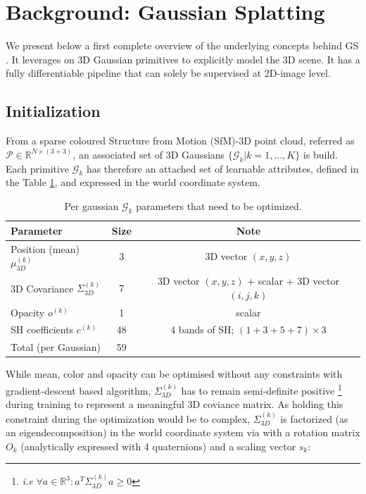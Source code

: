 \section{Background: Gaussian Splatting}
We present below a first complete overview of the underlying concepts behind \ac{GS} \citep{kerbl20233d}. It leverages on 3D Gaussian primitives to explicitly model the 3D scene. It has a fully differentiable pipeline that can solely be supervised at 2D-image level. 


\subsection{Initialization} From a sparse coloured Structure from Motion (SfM)-3D point cloud, referred as $\mathcal{P}\in\mathbb{R}^{N\times(3+3)}$, an associated set of 3D Gaussians $\{\mathcal{G}_{k}|k=1,...,K\}$ is build. Each primitive $\mathcal{G}_{k} $ has therefore an attached set of learnable attributes, defined in the Table \ref{tab:gauss-param}, and expressed in the world coordinate system.

\begin{table}[h!]
  \centering
   \caption{Per gaussian $\mathcal{G}_{k} $  parameters that need to be optimized.}
  \begin{tabular}{lcc}
  \hline
  Parameter  & Size & Note \\
  \hline
  Position (mean)  $\mu^{(k)}_{3D}$ & 3 & 3D vector $(x, y, z)$ \\
  3D Covariance $\Sigma^{(k)}_{3D}$ & 7 & 3D vector $(x, y, z)$ + scalar + 3D vector  $(i, j, k)$\\
  Opacity  $o^{(k)}$ & 1 & scalar \\
  SH coefficients  $c^{(k)}$ & 48 & 4 bands of SH; $(1+3+5+7)\times3$ \\
  \hline
  Total (per Gaussian)  & 59 & \\
  \hline
  \end{tabular}
 
  \label{tab:gauss-param}
\end{table}

While mean, color and opacity can be optimised without any constraints with gradient-descent based algorithm, $\Sigma^{(k)}_{3D}$ has to remain semi-definite positive \footnote{\textit{i.e} $ \forall a \in \mathbb{R}^{3}: a^{T}\Sigma^{(k)}_{3D}a \geq 0$} during training to represent a meaningful 3D coviance matrix. As holding this constraint during the optimization would be to complex, $\Sigma^{(k)}_{3D}$ is factorized (as an eigendecomposition) in the world coordinate system via with a rotation matrix $O_{k}$ (analytically expressed with 4 quaternions) and a scaling vector $s_{k}$: 

